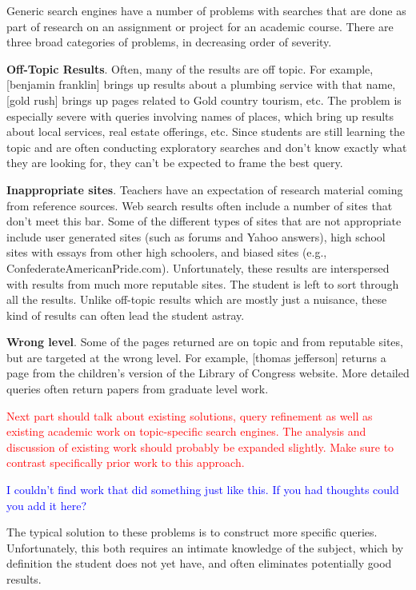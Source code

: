 \documentclass[pdfpagelabels=false,plainpages=true]{acm_proc_article-sp}
\begin{document}
Generic search engines have a number of problems with searches that are done as
part of research on an assignment or project for an academic course. There are
three broad categories of problems, in decreasing order of severity. 

{\bf Off-Topic Results}. Often, many of the results are off topic. For example,
[benjamin franklin] brings up results about a plumbing service with that name,
[gold rush] brings up pages related to Gold country tourism, etc. The problem is
especially severe with queries involving names of places, which bring up results
about local services, real estate offerings, etc. Since students are still
learning the topic and are often conducting exploratory searches and don't know
exactly what they are looking for, they can't be expected to frame the best
query. 

{\bf Inappropriate sites}. Teachers have an expectation of research material
coming from reference sources. Web search results often include a number of
sites that don't meet this bar. Some of the different types of sites that are
not appropriate include user generated sites (such as forums and Yahoo answers),
high school sites with essays from other high schoolers, and biased sites (e.g.,
ConfederateAmericanPride.com). Unfortunately, these results are interspersed
with results from much more reputable sites. The student is left to sort through
all the results. Unlike off-topic results which are mostly just a nuisance,
these kind of results can often lead the student astray. 

{\bf Wrong level}. Some of the pages returned are on topic and from reputable
sites, but are targeted at the wrong level. For example, [thomas jefferson]
returns a page from the children's version of the Library of Congress
website. More detailed queries often return papers from graduate level work. 

\textcolor{red}{Next part should talk about existing solutions, query refinement as
  well as existing academic work on topic-specific search engines. The analysis
  and discussion of existing work should probably be expanded slightly. Make
  sure to contrast specifically prior work to this approach.}


\textcolor{blue}{I couldn't find work that did something just like this. If you
  had thoughts could you add it here?} 

The typical solution to these problems is to construct more specific
queries. Unfortunately, this both requires an intimate knowledge of the subject,
which by definition the student does not yet have, and often eliminates
potentially good results. 
\end{document}
